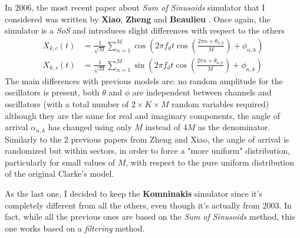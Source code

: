 In 2006, the most recent paper about \textit{Sum of Sinusoids} simulator that I considered was written by \textbf{Xiao}, \textbf{Zheng} and \textbf{Beaulieu} \cite{B1}. Once again, the simulator is a \textit{SoS} and introduces slight differences with respect to the others%
%
\begin{subequations}
	\begin{align}
	X_{k,c}(t) &= \frac{1}{\sqrt{M}} \sum_{n=1}^{M} \cos \left( 2\pi f_d t \cos \left( \frac{2\pi n  + \theta_{n,k}}{M}\right) + \phi_{n,k} \right)\\
	X_{k,s}(t) &= \frac{1}{\sqrt{M}} \sum_{n=1}^{M} \sin \left( 2\pi f_d t \cos \left( \frac{2\pi n  + \theta_{n,k}}{M}\right) + \phi_{n,k} \right)
	\end{align}
\end{subequations}%
%
The main differences with previous models are: no random amplitude for the oscillators is present, both $\theta$ and $\phi$ are independent between channels and oscillators (with a total number of $2 \times K \times M$ random variables required) although they are the same for real and imaginary components, the angle of arrival $\alpha_{n,k}$ has changed using only $M$ instead of $4M$ as the denominator. Similarly to the 2 previous papers from Zheng and Xiao, the angle of arrival is randomized but within sectors, in order to force a "more uniform" distribution, particularly for small values of $M$, with respect to the pure uniform distribution of the original Clarke's model.

As the last one, I decided to keep the \textbf{Komninakis} simulator \cite{A3} since it's completely different from all the others, even though it's actually from 2003. In fact, while all the previous ones are based on the \textit{Sum of Sinusoids} method, this one works based on a \textit{filtering} method.%
%
\begin{figure}[h!]
	\centering
	
\end{figure}

